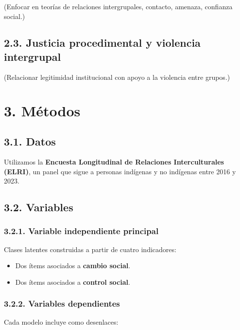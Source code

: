 \documentclass[
  letterpaper,
  DIV=11,
  numbers=noendperiod]{scrartcl}
\providecommand{\tightlist}{%
  \setlength{\itemsep}{0pt}\setlength{\parskip}{0pt}}\usepackage{longtable,booktabs,array}
\begin{document}
(Enfocar en teorías de relaciones intergrupales, contacto, amenaza,
confianza social.)

\subsection{2.3. Justicia procedimental y violencia
intergrupal}\label{justicia-procedimental-y-violencia-intergrupal}

(Relacionar legitimidad institucional con apoyo a la violencia entre
grupos.)

\section{3. Métodos}\label{muxe9todos}

\subsection{3.1. Datos}\label{datos}

Utilizamos la \textbf{Encuesta Longitudinal de Relaciones
Interculturales (ELRI)}, un panel que sigue a personas indígenas y no
indígenas entre 2016 y 2023.

\subsection{3.2. Variables}\label{variables}

\subsubsection{3.2.1. Variable independiente
principal}\label{variable-independiente-principal}

Clases latentes construidas a partir de cuatro indicadores:

\begin{itemize}
\tightlist
\item
  Dos ítems asociados a \textbf{cambio social}.\\
\item
  Dos ítems asociados a \textbf{control social}.
\end{itemize}

\subsubsection{3.2.2. Variables
dependientes}\label{variables-dependientes}

Cada modelo incluye como desenlaces:
\end{document}
